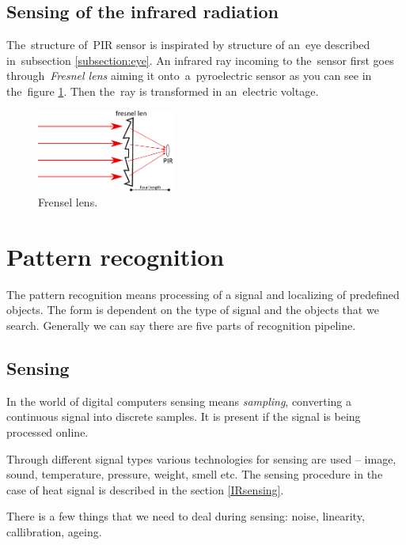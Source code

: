 \subsection*{Sensing of the infrared radiation}
The~structure of~PIR sensor is inspirated by structure of an~eye described in~subsection \ref{subsection:eye}.
An infrared ray incoming to the~sensor first goes through~{\it Fresnel lens} aiming it onto~a~pyroelectric sensor
as you can see in the~figure \ref{fig:fresnellens}. Then the~ray is transformed in an~electric voltage.

\begin{figure}[h!]
\begin{center}
\includegraphics[width=0.4\textwidth]{obrazky-figures/fresnellens.png}
\caption{Frensel lens.\label{fig:fresnellens}}
\end{center}
\end{figure}



\newpage
\section{Pattern recognition}
The pattern recognition means processing of a signal and localizing of predefined objects.
The form is dependent on the type of signal and the objects that we search. Generally we can say
there are five parts of recognition pipeline.

\subsection*{Sensing}
In the world of digital computers sensing means {\it sampling}, converting a continuous signal
into discrete samples. It is present if the signal is being processed online.

Through different signal types various technologies for sensing are used -- image, sound, temperature,
pressure, weight, smell etc. The sensing procedure in the case of heat signal is described in the section
\ref{IRsensing}.

There is a few things that we need to deal during sensing: noise, linearity, callibration, ageing.

